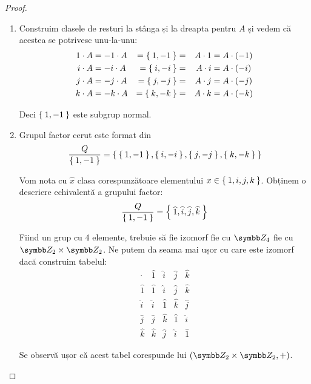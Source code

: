 \begin{proof}
\begin{enumerate}
    \item Construim clasele de resturi la stânga și la dreapta pentru \(A\) și vedem că acestea se potrivesc unu-la-unu:
    \[
    \begin{aligned}[c]
        1 \cdot A &= -1 \cdot A \\
        i \cdot A &= -i \cdot A \\
        j \cdot A &= -j \cdot A \\
        k \cdot A &= -k \cdot A
    \end{aligned}
    \quad
    \begin{aligned}[c]
        = \Set{ 1, -1 } = \\
        = \Set{ i, -i } = \\
        = \Set{ j, -j } = \\
        = \Set{ k, -k } =
    \end{aligned}
    \quad
    \begin{aligned}[c]
        A \cdot 1 &= A \cdot (-1) \\
        A \cdot i &= A \cdot (-i) \\
        A \cdot j &= A \cdot (-j) \\
        A \cdot k &= A \cdot (-k)
    \end{aligned}
    \]

    Deci \(\Set{ 1, -1 }\) este subgrup normal.

    \item Grupul factor cerut este format din
    \[
        \frac{Q}{\Set{1, -1}} = \Set{ \Set{1, -1}, \Set{i, -i}, \Set{j, -j}, \Set{k, -k} }
    \]

    Vom nota cu \(\widehat{x}\) clasa corespunzătoare elementului \(x \in \Set{ 1, i, j, k }\).
    Obținem o descriere echivalentă a grupului factor:
    \[
        \frac{Q}{\Set{1, -1}} = \Set{ \widehat{1}, \widehat{i}, \widehat{j}, \widehat{k} }
    \]

    Fiind un grup cu 4 elemente, trebuie să fie izomorf fie cu \(\integersmod{4}\) fie cu \(\integersmod{2} \times \integersmod{2}\).
    Ne putem da seama mai ușor cu care este izomorf dacă construim tabelul:
    \[
    \begin{array}{c|c|c|c|c}
         \cdot & \widehat{1} & \widehat{i} & \widehat{j} & \widehat{k} \\
         \hline
         \widehat{1} & \widehat{1} & \widehat{i} & \widehat{j} & \widehat{k} \\
         \hline
         \widehat{i} & \widehat{i} & \widehat{1} & \widehat{k} & \widehat{j} \\
         \hline
         \widehat{j} & \widehat{j} & \widehat{k} & \widehat{1} & \widehat{i} \\
         \hline
         \widehat{k} & \widehat{k} & \widehat{j} & \widehat{i} & \widehat{1}
    \end{array}
    \]

    Se observă ușor că acest tabel corespunde lui \((\integersmod{2} \times \integersmod{2}, +)\).
\end{enumerate}
\end{proof}

